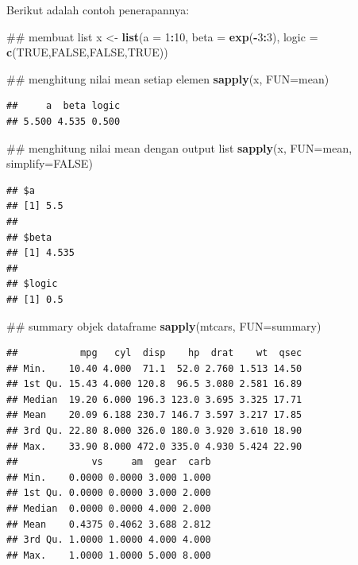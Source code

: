 \documentclass[]{book}
\newenvironment{Shaded}{\begin{snugshade}}{\end{snugshade}}
\newcommand{\KeywordTok}[1]{\textcolor[rgb]{0.13,0.29,0.53}{\textbf{#1}}}
\newcommand{\DataTypeTok}[1]{\textcolor[rgb]{0.13,0.29,0.53}{#1}}
\newcommand{\DecValTok}[1]{\textcolor[rgb]{0.00,0.00,0.81}{#1}}
\newcommand{\StringTok}[1]{\textcolor[rgb]{0.31,0.60,0.02}{#1}}
\newcommand{\OtherTok}[1]{\textcolor[rgb]{0.56,0.35,0.01}{#1}}
\newcommand{\OperatorTok}[1]{\textcolor[rgb]{0.81,0.36,0.00}{\textbf{#1}}}
\newcommand{\NormalTok}[1]{#1}
\begin{document}
Berikut adalah contoh penerapannya:

\begin{Shaded}
\begin{Highlighting}[]
\NormalTok{## membuat list}
\NormalTok{x <-}\StringTok{ }\KeywordTok{list}\NormalTok{(}\DataTypeTok{a =} \DecValTok{1}\OperatorTok{:}\DecValTok{10}\NormalTok{, }\DataTypeTok{beta =} \KeywordTok{exp}\NormalTok{(}\OperatorTok{-}\DecValTok{3}\OperatorTok{:}\DecValTok{3}\NormalTok{), }\DataTypeTok{logic =} \KeywordTok{c}\NormalTok{(}\OtherTok{TRUE}\NormalTok{,}\OtherTok{FALSE}\NormalTok{,}\OtherTok{FALSE}\NormalTok{,}\OtherTok{TRUE}\NormalTok{))}

\NormalTok{## menghitung nilai mean setiap elemen}
\KeywordTok{sapply}\NormalTok{(x, }\DataTypeTok{FUN=}\NormalTok{mean)}
\end{Highlighting}
\end{Shaded}

\begin{verbatim}
##     a  beta logic 
## 5.500 4.535 0.500
\end{verbatim}

\begin{Shaded}
\begin{Highlighting}[]
\NormalTok{## menghitung nilai mean dengan output list}
\KeywordTok{sapply}\NormalTok{(x, }\DataTypeTok{FUN=}\NormalTok{mean, }\DataTypeTok{simplify=}\OtherTok{FALSE}\NormalTok{)}
\end{Highlighting}
\end{Shaded}

\begin{verbatim}
## $a
## [1] 5.5
## 
## $beta
## [1] 4.535
## 
## $logic
## [1] 0.5
\end{verbatim}

\begin{Shaded}
\begin{Highlighting}[]
\NormalTok{## summary objek dataframe}
\KeywordTok{sapply}\NormalTok{(mtcars, }\DataTypeTok{FUN=}\NormalTok{summary)}
\end{Highlighting}
\end{Shaded}

\begin{verbatim}
##           mpg   cyl  disp    hp  drat    wt  qsec
## Min.    10.40 4.000  71.1  52.0 2.760 1.513 14.50
## 1st Qu. 15.43 4.000 120.8  96.5 3.080 2.581 16.89
## Median  19.20 6.000 196.3 123.0 3.695 3.325 17.71
## Mean    20.09 6.188 230.7 146.7 3.597 3.217 17.85
## 3rd Qu. 22.80 8.000 326.0 180.0 3.920 3.610 18.90
## Max.    33.90 8.000 472.0 335.0 4.930 5.424 22.90
##             vs     am  gear  carb
## Min.    0.0000 0.0000 3.000 1.000
## 1st Qu. 0.0000 0.0000 3.000 2.000
## Median  0.0000 0.0000 4.000 2.000
## Mean    0.4375 0.4062 3.688 2.812
## 3rd Qu. 1.0000 1.0000 4.000 4.000
## Max.    1.0000 1.0000 5.000 8.000
\end{verbatim}
\end{document}
